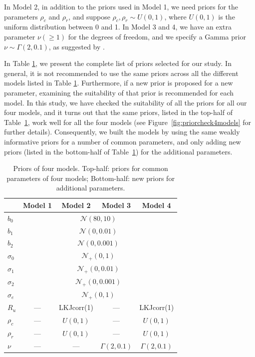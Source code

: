 \documentclass[a4paper]{article}   	%
\newcommand{\N}{\mathcal{N}}
\begin{document}
	
	
	In Model 2, in addition to the priors used in Model 1, we need priors for the parameters $\rho_c$ and $\rho_r$, and suppose $\rho_c,\rho_r\sim U(0,1)$, where $U(0,1)$ is the uniform distribution between 0 and 1. In Model 3 and 4, we have an extra parameter $\nu(\geq 1)$ for the degrees of freedom, and we specify a Gamma prior $\nu\sim \Gamma(2,0.1)$, as suggested by \textcite{Juarez2010ModelBased}. 
	
	In Table \ref{tb:priors}, we present the complete list of priors selected for our study. In general, it is not recommended to use the same priors across all the different models listed in Table \ref{tb:priors}. Furthermore, if a new prior is proposed for a new parameter, examining the suitability of that prior is recommended for each model. In this study, we have checked the suitability of all the priors for all our four models, and it turns out that the same priors, listed in the top-half of Table~\ref{tb:priors}, work well for all the four models (see Figure~\ref{fig:priorcheck4models} for further details). Consequently, we built the models by using the same weakly informative priors for a number of common parameters, and only adding new priors (listed in the bottom-half of Table~\ref{tb:priors}) for the additional parameters.
	
	
	
	
	\begin{table}[!htp]
		\centering
		\begin{tabular}{l *{4}{c}} \toprule
			& Model 1 & Model 2& Model 3& Model 4  \\ \midrule
			$b_0$ & \multicolumn{4}{c}{$\N(80, 10)$} \\ 
			$b_1$ & \multicolumn{4}{c}{$\N(0, 0.01)$} \\ 
			$b_2$ & \multicolumn{4}{c}{$\N(0, 0.001)$} \\ 
			$\sigma_0$ & \multicolumn{4}{c}{$\N_+(0, 1)$} \\ 
			$\sigma_1$ & \multicolumn{4}{c}{$\N_+(0, 0.01)$} \\
			$\sigma_2$ & \multicolumn{4}{c}{$\N_+(0, 0.001)$} \\ 
			$\sigma_e$ & \multicolumn{4}{c}{$\N_+(0, 1)$} \\ \midrule
			$R_u$ & --- & LKJcorr(1) & --- & LKJcorr(1) \\ 
			$\rho_c$ & --- & $U(0,1)$ & --- & $U(0,1)$ \\ 
			$\rho_r$ & --- & $U(0,1)$ & --- &  $U(0,1)$ \\ 		
			$\nu$ & --- &  --- & $\Gamma(2,0.1)$ & $\Gamma(2,0.1)$ \\ 
			\bottomrule
		\end{tabular}\caption{Priors of four models. Top-half: priors for common parameters of four models; Bottom-half: new priors for additional parameters.}\label{tb:priors}
	\end{table}
	
\end{document}
